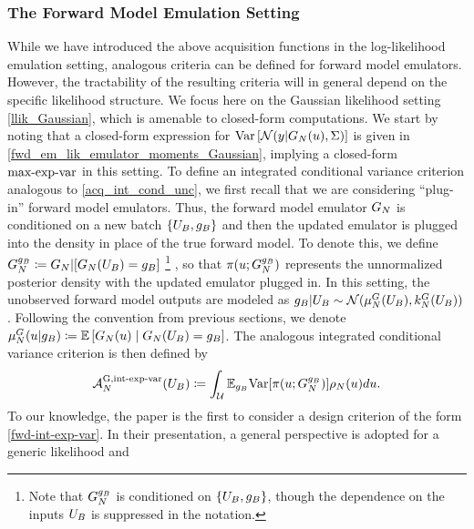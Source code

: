 \documentclass[12pt]{article}
\begin{document}
\subsubsection{The Forward Model Emulation Setting}
While we have introduced the above acquisition functions in the log-likelihood emulation setting, analogous 
criteria can be defined for forward model emulators. However, the tractability of the resulting criteria will in 
general depend on the specific likelihood structure. We focus here on the Gaussian likelihood setting 
\ref{llik_Gaussian}, which is amenable to closed-form computations. We start by noting that a closed-form
expression for $\Var\left[\Gaussian(\obs| \fwdEm[\Ndesign](\Par), \likPar) \right]$ is given in
\ref{fwd_em_lik_emulator_moments_Gaussian}, implying a closed-form $\maxexpvarLabel$ 
in this setting. To define an integrated conditional variance criterion analogous to 
\ref{acq_int_cond_unc}, we first recall that we are considering ``plug-in'' forward model emulators. 
Thus, the forward model emulator $\fwdEm$ is conditioned on a new batch 
$\{\designBatchIn, \designBatchFwd\}$ and then the updated emulator is plugged into the density 
in place of the true forward model. 
To denote this, we define 
$\fwdEmCond{\designBatchFwd} \Def \fwdEm | [\fwdEm(\designBatchIn) = \designBatchFwd]$
\footnote{Note that $\fwdEmCond{\designBatchFwd}$ is conditioned on $\{\designBatchIn, \designBatchFwd\}$, though the 
dependence on the inputs $\designBatchIn$ is suppressed in the notation.}
, so that 
$\postDens(\Par; \fwdEmCond{\designBatchFwd})$ represents the unnormalized posterior density 
with the updated emulator plugged in.  
In this setting, the unobserved forward model outputs are modeled 
as $\designBatchFwd|\designBatchIn \sim \Gaussian(\emMean{\fwd}(\designBatchIn), \emKer{\fwd}(\designBatchIn))$.
Following the convention from previous sections, we denote 
$\emMean[\Ndesign]{\fwd}(\Par | \designBatchFwd) \Def \E\left[\fwdEm(\Par) \given \fwdEm(\designBatchIn) = \designBatchFwd\right]$.
The analogous integrated conditional variance criterion is then defined by 
\begin{equation}
\labelAcq[\Ndesign]{\fwdintExpVarLabel}(\designBatchIn) \Def
\int_{\parSpace} \E_{\designBatchFwd} \Var[\postDens(\Par; \fwdEmCond{\designBatchFwd})]\weightDens(\Par) d\Par. \label{fwd-int-exp-var}
\end{equation}
To our knowledge, the paper \cite{SinsbeckNowak} is the first to consider a design criterion of the 
form \ref{fwd-int-exp-var}. In their presentation, a general perspective is adopted for a generic likelihood and 
\end{document}
